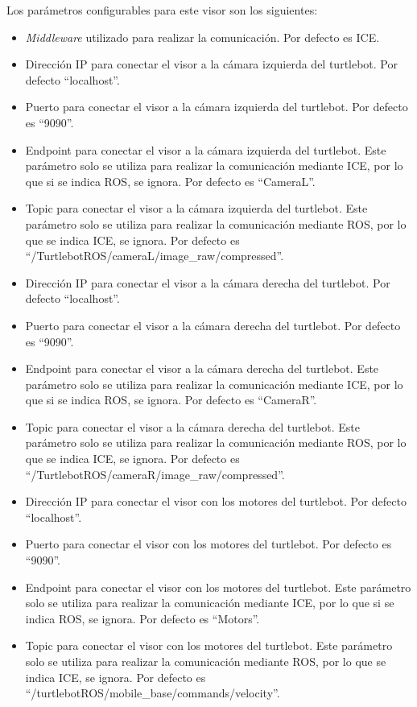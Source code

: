 Los parámetros configurables para este visor son los siguientes:
\begin{itemize}
\item \textit{Middleware} utilizado para realizar la comunicación. Por defecto es ICE.
\item Dirección IP para conectar el visor a la cámara izquierda del turtlebot. Por defecto ``localhost''.
\item Puerto para conectar el visor a la cámara izquierda del turtlebot. Por defecto es ``9090''.
\item Endpoint para conectar el visor a la cámara izquierda del turtlebot. Este parámetro solo se utiliza para realizar la comunicación mediante ICE, por lo que si se indica ROS, se ignora. Por defecto es ``CameraL''.
\item Topic para conectar el visor a la cámara izquierda del turtlebot. Este parámetro solo se utiliza para realizar la comunicación mediante ROS, por lo que se indica ICE, se ignora. Por defecto es ``/TurtlebotROS/cameraL/image\_raw/compressed''.
\item Dirección IP para conectar el visor a la cámara derecha del turtlebot. Por defecto ``localhost''.
\item Puerto para conectar el visor a la cámara derecha del turtlebot. Por defecto es ``9090''.
\item Endpoint para conectar el visor a la cámara derecha del turtlebot. Este parámetro solo se utiliza para realizar la comunicación mediante ICE, por lo que si se indica ROS, se ignora. Por defecto es ``CameraR''.
\item Topic para conectar el visor a la cámara derecha del turtlebot. Este parámetro solo se utiliza para realizar la comunicación mediante ROS, por lo que se indica ICE, se ignora. Por defecto es ``/TurtlebotROS/cameraR/image\_raw/compressed''.
\item Dirección IP para conectar el visor con los motores del turtlebot. Por defecto ``localhost''.
\item Puerto para conectar el visor con los motores del turtlebot. Por defecto es ``9090''.
\item Endpoint para conectar el visor con los motores del turtlebot. Este parámetro solo se utiliza para realizar la comunicación mediante ICE, por lo que si se indica ROS, se ignora. Por defecto es ``Motors''.
\item Topic para conectar el visor con los motores del turtlebot. Este parámetro solo se utiliza para realizar la comunicación mediante ROS, por lo que se indica ICE, se ignora. Por defecto es ``/turtlebotROS/mobile\_base/commands/velocity''.

\end{itemize}
